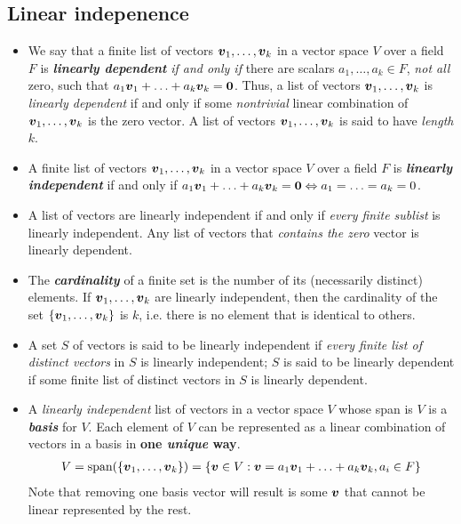 \documentclass[11pt]{article}
\begin{document}
\subsection{Linear indepenence}
\begin{itemize}
\item We say that a finite list of vectors $\boldsymbol{v}_1, \ldots, \boldsymbol{v}_k$ in a vector space $V$ over a field $F$ is \emph{\textbf{linearly dependent}} \emph{if and
only if} there are scalars $a_1, \ldots, a_k \in F$, \emph{not all} zero, such that $a_1\boldsymbol{v}_1 + \ldots + a_k\boldsymbol{v}_k = \boldsymbol{0}$. Thus, a list of vectors $\boldsymbol{v}_1, \ldots, \boldsymbol{v}_k$ is \emph{linearly dependent} if and only if some \emph{nontrivial} linear combination of $\boldsymbol{v}_1, \ldots, \boldsymbol{v}_k$ is the zero vector. A list of vectors  $\boldsymbol{v}_1, \ldots, \boldsymbol{v}_k$ is said to have \emph{length} $k$.

\item A finite list of vectors $\boldsymbol{v}_1, \ldots, \boldsymbol{v}_k$ in a vector space $V$ over a field $F$ is \emph{\textbf{linearly independent}} if and only if  $a_1\boldsymbol{v}_1 + \ldots + a_k\boldsymbol{v}_k = \boldsymbol{0} \Leftrightarrow a_1= \ldots = a_k = 0$. 
\item A list of vectors are linearly independent if and only if \emph{every finite sublist} is linearly independent. Any list of vectors that \emph{contains the zero} vector is linearly dependent.

\item The \emph{\textbf{cardinality}} of a finite set is the number of its (necessarily distinct) elements. If  $\boldsymbol{v}_1, \ldots, \boldsymbol{v}_k$ are linearly independent, then the cardinality of the set $\{\boldsymbol{v}_1, \ldots, \boldsymbol{v}_k\}$ is $k$, i.e. there is no element that is identical to others.

\item A set $S$ of vectors is said to be linearly independent if \emph{every finite list of distinct vectors} in $S$ is linearly independent; $S$ is said to be linearly dependent if some finite list of distinct vectors in $S$ is linearly dependent.

\item A \emph{linearly independent} list of vectors in a vector space $V$ whose span is $V$ is a \emph{\textbf{basis}} for $V$. Each element of $V$ can be represented as a linear combination of vectors in a basis in \textbf{one \emph{unique} way}.
\begin{align*}
V = \text{span}(\left\{\boldsymbol{v}_1, \ldots, \boldsymbol{v}_k\right\}) = \left\{\boldsymbol{v}\in V: \boldsymbol{v} = a_1\boldsymbol{v}_1 + \ldots + a_k\boldsymbol{v}_k, a_i \in F\right\}
\end{align*} Note that removing one basis vector will result is some $\boldsymbol{v}$ that cannot be linear represented by the rest. 


\end{itemize}
\end{document}
